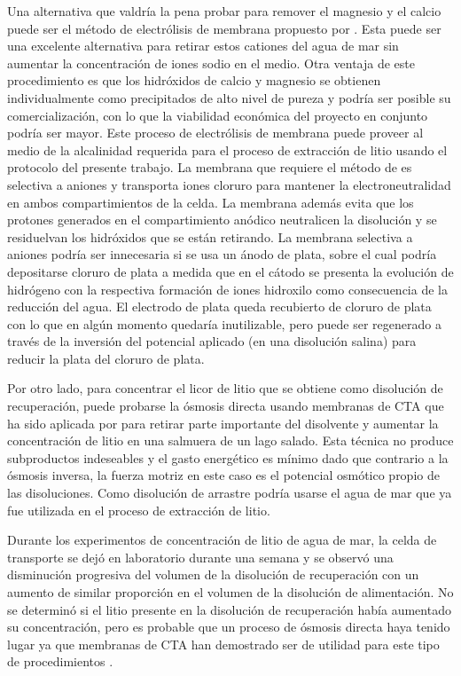 Una alternativa que valdría la pena probar para remover el magnesio y el calcio puede ser el método de electrólisis de membrana propuesto por \citet{Diaz2019}. Esta puede ser una excelente alternativa para retirar estos cationes del agua de mar sin aumentar la concentración de iones sodio en el medio. Otra ventaja de este procedimiento es que los hidróxidos de calcio y magnesio se obtienen individualmente como precipitados de alto nivel de pureza y podría ser posible su comercialización, con lo que la viabilidad económica del proyecto en conjunto podría ser mayor. Este proceso de electrólisis de membrana puede proveer al medio de la alcalinidad requerida para el proceso de extracción de litio usando el protocolo del presente trabajo. La membrana que requiere el método de \citet{Diaz2019} es selectiva a aniones y transporta iones cloruro para mantener la electroneutralidad en ambos compartimientos de la celda. La membrana además evita que los protones generados en el compartimiento anódico neutralicen la disolución y se residuelvan los hidróxidos que se están retirando. La membrana selectiva a aniones podría ser innecesaria si se usa un ánodo de plata, sobre el cual podría depositarse cloruro de plata a medida que en el cátodo se presenta la evolución de hidrógeno con la respectiva formación de iones hidroxilo como consecuencia de la reducción del agua. El electrodo de plata queda recubierto de cloruro de plata con lo que en algún momento quedaría inutilizable, pero puede ser regenerado a través de la inversión del potencial aplicado (en una disolución salina) para reducir la plata del cloruro de plata.

Por otro lado, para concentrar el licor de litio que se obtiene como disolución de recuperación, puede probarse la ósmosis directa usando membranas de \ac{CTA} que ha sido aplicada por \citet{Li2018} para retirar parte importante del disolvente y aumentar la concentración de litio en una salmuera de un lago salado. Esta técnica no produce subproductos indeseables y el gasto energético es mínimo dado que contrario a la ósmosis inversa, la fuerza motriz en este caso es el potencial osmótico propio de las disoluciones. Como disolución de arrastre podría usarse el agua de mar que ya fue utilizada en el proceso de extracción de litio. 

Durante los experimentos de concentración de litio de agua de mar, la celda de transporte se dejó en laboratorio durante una semana y se observó una disminución progresiva del volumen de la disolución de recuperación con un aumento de similar proporción en el volumen de la disolución de alimentación. No se determinó si el litio presente en la disolución de recuperación había aumentado su concentración, pero es probable que un proceso de ósmosis directa haya tenido lugar ya que membranas de \ac{CTA} han demostrado ser de utilidad para este tipo de procedimientos \citep{Li2018}.

